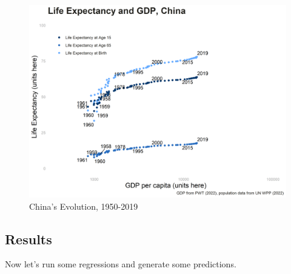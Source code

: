 \begin{figure}[H]
	\centering %
	\includegraphics[width=.6\linewidth]{figures/ECON-412/gdp_pc_le_China.png}
	\caption{China's Evolution, 1950-2019} %
	\label{fig:fig3}
\end{figure}



\subsection{Results}

Now let's run some regressions and generate some predictions.


